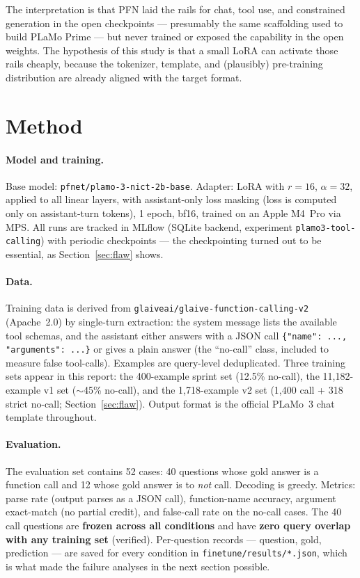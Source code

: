 \documentclass[10pt]{article}
\begin{document}
The interpretation is that PFN laid the rails for chat, tool use, and constrained
generation in the open checkpoints --- presumably the same scaffolding used to build PLaMo
Prime --- but never trained or exposed the capability in the open weights. The hypothesis
of this study is that a small LoRA can activate those rails cheaply, because the
tokenizer, template, and (plausibly) pre-training distribution are already aligned with
the target format.

\section{Method}
\label{sec:method}

\paragraph{Model and training.}
Base model: \texttt{pfnet/plamo-3-nict-2b-base}. Adapter: LoRA with $r=16$,
$\alpha=32$, applied to all linear layers, with assistant-only loss masking
(loss is computed only on assistant-turn tokens), 1 epoch, bf16, trained on an Apple
M4~Pro via MPS. All runs are tracked in MLflow (SQLite backend,
experiment \texttt{plamo3-tool-calling}) with periodic checkpoints --- the
checkpointing turned out to be essential, as Section~\ref{sec:flaw} shows.

\paragraph{Data.}
Training data is derived from \texttt{glaiveai/glaive-function-calling-v2} (Apache~2.0)
by single-turn extraction: the system message lists the available tool schemas, and the
assistant either answers with a JSON call \texttt{\{"name": ..., "arguments": ...\}} or
gives a plain answer (the ``no-call'' class, included to measure false tool-calls).
Examples are query-level deduplicated. Three training sets appear in this report: the
400-example sprint set (12.5\% no-call), the 11{,}182-example v1 set ($\sim$45\% no-call),
and the 1{,}718-example v2 set (1{,}400 call + 318 strict no-call;
Section~\ref{sec:flaw}). Output format is the official PLaMo~3 chat template throughout.

\paragraph{Evaluation.}
The evaluation set contains 52 cases: 40 questions whose gold answer is a function call
and 12 whose gold answer is to \emph{not} call. Decoding is greedy. Metrics: parse rate
(output parses as a JSON call), function-name accuracy, argument exact-match (no partial
credit), and false-call rate on the no-call cases. The 40 call questions are
\textbf{frozen across all conditions} and have \textbf{zero query overlap with any
training set} (verified). Per-question records --- question, gold, prediction --- are saved
for every condition in \texttt{finetune/results/*.json}, which is what made the failure
analyses in the next section possible.
\end{document}
